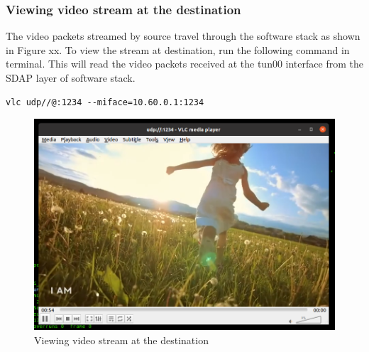 \subsubsection{Viewing video stream at the destination}
The video packets streamed by source travel through the software stack as shown in Figure xx.
To view the stream at destination, run the following command in terminal. This will read the video packets received at the tun00 interface from the SDAP layer of software stack.~\cite{VLC}
\begin{lstlisting}
vlc udp//@:1234 --miface=10.60.0.1:1234
\end{lstlisting}

\begin{figure}[h!]
\centering
\includegraphics[width=1.05\columnwidth]{./Figures/Destination_viewing_stream.png}
\caption{Viewing video stream at the destination}
\label{Destination_viewing_stream}
\end{figure}
%
\newpage
